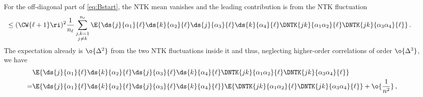 For the off-diagonal part of \eqref{eq:Bstart}, the NTK mean vanishes and the leading contribution is from the NTK fluctuation
\begin{align}\label{eq:NTHvariance_piece2_first_line}
&\le(\CW{\ell+1}\ri)^2\frac{1}{n_{\ell}}\sum_{\substack{j,k=1\\j\ne k}}^{n_{\ell}}\E{\ds{j}{\alpha_1}{\ell} \ds{k}{\alpha_2}{\ell} \ds{j}{\alpha_3}{\ell} \ds{k}{\alpha_4}{\ell}\DNTK{jk}{\alpha_1\alpha_2}{\ell}\DNTK{jk}{\alpha_3\alpha_4}{\ell} }\, .
\end{align}
The expectation already is $\o{\Delta^2}$ from the two NTK fluctuations inside it and thus, neglecting higher-order correlations of order $\o{\Delta^3}$, we have
\begin{align}\label{eq:the-most-subtle}
&\E{\ds{j}{\alpha_1}{\ell} \ds{k}{\alpha_2}{\ell} \ds{j}{\alpha_3}{\ell} \ds{k}{\alpha_4}{\ell}\DNTK{jk}{\alpha_1\alpha_2}{\ell}\DNTK{jk}{\alpha_3\alpha_4}{\ell} }\, \\
=&\E{\ds{j}{\alpha_1}{\ell} \ds{k}{\alpha_2}{\ell} \ds{j}{\alpha_3}{\ell} \ds{k}{\alpha_4}{\ell}}\E{\DNTK{jk}{\alpha_1\alpha_2}{\ell}\DNTK{jk}{\alpha_3\alpha_4}{\ell} }+\o{\frac{1}{n^2}}\, ,\notag
\end{align}
